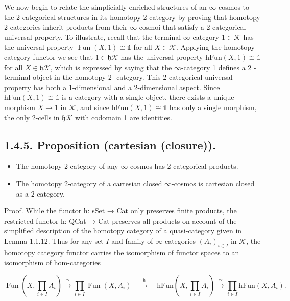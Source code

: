 \documentclass[10pt]{article}
\begin{document}
We now begin to relate the simplicially enriched structures of an $\infty$-cosmos to the 2-categorical structures in its homotopy 2-category by proving that homotopy 2-categories inherit products from their $\infty$-cosmoi that satisfy a 2-categorical universal property. To illustrate, recall that the terminal $\infty$-category $1 \in \mathcal{K}$ has the universal property $\operatorname{Fun}(X, 1) \cong \mathbb{1}$ for all $X \in \mathcal{K}$. Applying the homotopy category functor we see that $1 \in \mathfrak{h} \mathcal{K}$ has the universal property $\mathrm{hFun}(X, 1) \cong \mathbb{1}$ for all $X \in \mathfrak{h} \mathcal{K}$, which is expressed by saying that the $\infty$-category 1 defines a 2 -terminal object in the homotopy 2 -category. This 2-categorical universal property has both a 1-dimensional and a 2-dimensional aspect. Since $\mathrm{hFun}(X, 1) \cong \mathbb{1}$ is a category with a single object, there exists a unique morphism $X \rightarrow 1$ in $\mathcal{K}$, and since $\mathrm{hFun}(X, 1) \cong \mathbb{1}$ has only a single morphism, the only 2-cells in $\mathfrak{h} \mathcal{K}$ with codomain 1 are identities.

\subsection*{1.4.5. Proposition (cartesian (closure)).}
\begin{itemize}
  \item[(i)] The homotopy 2-category of any $\infty$-cosmos has 2-categorical products.
  \item[(ii)] The homotopy 2-category of a cartesian closed $\infty$-cosmos is cartesian closed as a 2-category.
\end{itemize}

Proof. While the functor h: sSet → Cat only preserves finite products, the restricted functor h: QCat → Cat preserves all products on account of the simplified description of the homotopy category of a quasi-category given in Lemma 1.1.12. Thus for any set $I$ and family of $\infty$-categories $\left(A_{i}\right)_{i \in I}$ in $\mathcal{K}$, the homotopy category functor carries the isomorphism of functor spaces to an isomorphism of hom-categories

$$
\operatorname{Fun}\left(X, \prod_{i \in I} A_{i}\right) \xrightarrow{\cong} \prod_{i \in I} \operatorname{Fun}\left(X, A_{i}\right) \quad \stackrel{\mathrm{h}}{\longrightarrow} \quad \mathrm{hFun}\left(X, \prod_{i \in I} A_{i}\right) \xrightarrow{\cong} \prod_{i \in I} \mathrm{hFun}\left(X, A_{i}\right) .
$$
\end{document}
